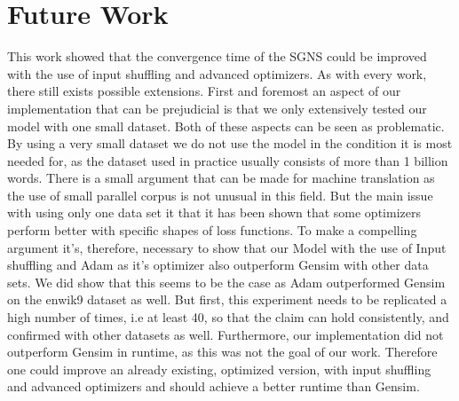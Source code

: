 \section{Future Work}
This work showed that the convergence time of the SGNS could be improved with the use of input shuffling and advanced optimizers. As with every work, there still exists possible extensions. First and foremost an aspect of our implementation that can be prejudicial is that we only extensively tested our model with one small dataset. Both of these aspects can be seen as problematic. By using a very small dataset we do not use the model in the condition it is most needed for, as the dataset used in practice usually consists of more than 1 billion words. There is a small argument that can be made for machine translation as the use of small parallel corpus is not unusual in this field. But the main issue with using only one data set it that it has been shown that some optimizers perform better with specific shapes of loss functions.  To make a compelling argument it's, therefore, necessary to show that our Model with the use of Input shuffling and Adam as it's optimizer also outperform Gensim with other data sets. We did show that this seems to be the case as Adam outperformed Gensim on the enwik9 dataset as well. But first, this experiment needs to be replicated a high number of times, i.e at least 40, so that the claim can hold consistently, and confirmed with other datasets as well.
Furthermore, our implementation did not outperform Gensim in runtime, as this was not the goal of our work. Therefore one could improve an already existing, optimized version, with input shuffling and advanced optimizers and should achieve a better runtime than Gensim.
